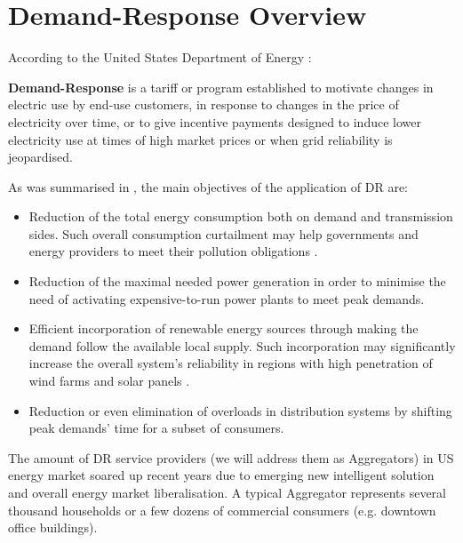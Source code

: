 \section{Demand-Response Overview}

According to the United States Department of Energy \cite{DepartmentofEnergyUSA2006}:

\begin{definition}
    \textbf{Demand-Response} is a tariff or program established to motivate changes in electric use by end-use customers, in response to changes in the price of electricity over time, or to give incentive payments designed to induce lower electricity use at times of high market prices or when grid reliability is jeopardised.
\end{definition} 

As was summarised in \cite{Vardakas2015}, the main objectives of the application of DR are:
\begin{itemize}
    \item Reduction of the total energy consumption both on demand and transmission sides. Such overall consumption curtailment may help governments and energy providers to meet their pollution obligations \cite{DepartmentofEnergyUSA2006, Shishlov2016, UnitedNations/FrameworkConventiononClimateChange2015}.
    \item Reduction of the maximal needed power generation in order to minimise  the need of activating expensive-to-run power plants to meet peak demands. 
    \item Efficient incorporation of renewable energy sources through making the demand follow the available local supply. Such incorporation may significantly increase the overall system's reliability in regions with high penetration of wind farms and solar panels \cite{Santacana2010}. 
    \item Reduction or even elimination of overloads in distribution systems by shifting peak demands' time for a subset of consumers.
\end{itemize} 

The amount of DR service providers (we will address them as Aggregators) in US energy market soared up recent years due to emerging new intelligent solution and overall energy market liberalisation. A typical Aggregator represents several thousand households or a few dozens of commercial consumers (e.g. downtown office buildings).  

